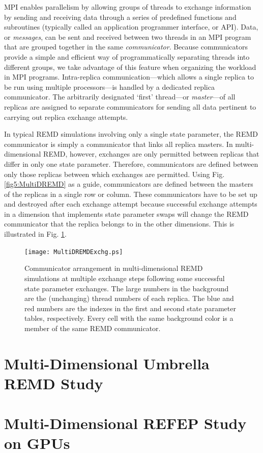 MPI enables parallelism by allowing groups of threads to exchange information by
sending and receiving data through a series of predefined functions and
subroutines (typically called an application programmer interface, or API).
Data, or \emph{messages}, can be sent and received between two threads in an MPI
program that are grouped together in the same \emph{communicator}. Because
communicators provide a simple and efficient way of programmatically separating
threads into different groups, we take advantage of this feature when organizing
the workload in MPI programs. Intra-replica communication---which allows a
single replica to be run using multiple processors---is handled by a dedicated
replica communicator. The arbitrarily designated `first' thread---or
\emph{master}---of all replicas are assigned to separate communicators for
sending all data pertinent to carrying out replica exchange attempts.

In typical REMD simulations involving only a single state parameter, the REMD
communicator is simply a communicator that links all replica masters. In
multi-dimensional REMD, however, exchanges are only permitted between replicas
that differ in only one state parameter. Therefore, communicators are defined
between only those replicas between which exchanges are permitted. Using Fig.
\ref{fig5:MultiDREMD} as a guide, communicators are defined between the masters
of the replicas in a single row or column. These communicators have to be set up
and destroyed after each exchange attempt because successful exchange attempts
in a dimension that implements state parameter swaps will change the REMD
communicator that the replica belongs to in the other dimensions. This is
illustrated in Fig. \ref{fig5:MultiDREMDExchg}.

\begin{figure}
   \texttt{[image: MultiDREMDExchg.ps]}
   \caption{Communicator arrangement in multi-dimensional REMD simulations at
            multiple exchange steps following some successful state parameter
            exchanges. The large numbers in the background are the (unchanging)
            thread numbers of each replica. The blue and red numbers are the
            indexes in the first and second state parameter tables,
            respectively. Every cell with the same background color is a member
            of the same REMD communicator.}
   \label{fig5:MultiDREMDExchg}
\end{figure}

\section{Multi-Dimensional Umbrella REMD Study}

\section{Multi-Dimensional REFEP Study on GPUs}
